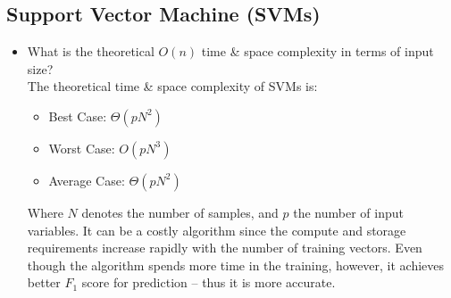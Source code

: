 \documentclass[12pt]{article}
\begin{document}
\subsection*{Support Vector Machine (SVMs)}
\begin{itemize}
\item What is the theoretical $O(n)$ time \& space complexity in terms of input size?\\
The theoretical time \& space complexity of SVMs is:
\begin{itemize}[noitemsep,nolistsep]
\item Best Case: $\Theta(pN^2)$ 
\item Worst Case: $O(pN^3)$
\item Average Case: $\Theta(pN^2)$
\end{itemize}
Where $N$ denotes the number of samples, and $p$ the number of input variables. 
It can be a costly algorithm since the compute and storage requirements increase rapidly with the number of training vectors. Even though the algorithm spends more time in the training, however, it achieves better $ F_1$ score for prediction – thus it is more accurate.


\end{itemize}
\end{document}
